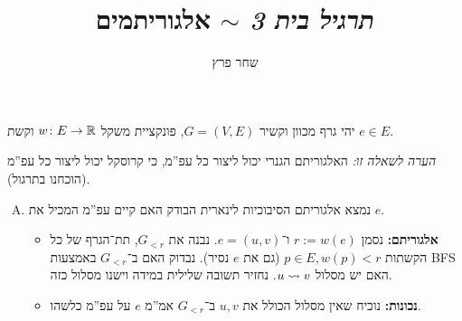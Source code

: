 \documentclass[]{../../../../tex/classes/homework}
\author{שחר פרץ}
\title{\textit{תרגיל בית 3} $\sim$ אלגוריתמים}
\begin{document}
	\maketitle
	
\section{}%
	
	יהי גרף מכוון וקשיר $G = (V, E)$, פונקציית משקל $w \colon E \to \mathbb{R}$ וקשת $e \in E$. 
	
	\textit{הערה לשאלה זו: }האלגוריתם הגנרי יכול ליצור כל עפ''מ, כי קרוסקל יכול ליצור כל עפ''מ (הוכחנו בתרגול). 
	\begin{enumerate}[(A)]
		\item נמצא אלגוריתם הסיבוכיות לינארית הבודק האם קיים עפ''מ המכיל את $e$. 
		\begin{itemize}
			\item \textbf{אלגוריתם: }נסמן $r := w(e)$ ו־$e = (u, v)$. נבנה את $G_{< r}$, תת־הגרף של כל הקשתות $p \in E, w(p) < r$ (גם את $e$ נסיר). נבדוק האם ב־$G_{< r}$ באמצעות BFS האם יש מסלול $u \rightsquigarrow v$. נחזיר תשובה שלילית במידה וישנו מסלול כזה. 
			
			\item \textbf{נכונות: }נוכיח שאין מסלול הכולל את $u, v$ ב־$G_{< r}$ אמ''מ $e$ על עפ''מ כלשהו. 
			

\end{itemize}
\end{enumerate}
\end{document}
